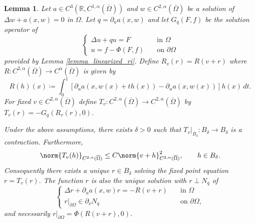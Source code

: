 \documentclass[11pt,a4paper]{amsart}
\newtheorem{Lemma}[Theorem]{Lemma}
\theoremstyle{definition}
\numberwithin{equation}{section}
\newcommand{\mR}{\mathbb{R}}                    %
\newcommand{\ol}[1]{\overline{#1}}
\newcommand{\p}{\partial}
\newcommand{\Om}{\Omega}
\begin{document}
\begin{Lemma}\label{lemma_fixed_point}
Let $a \in C^{3}(\mR, C^{1,\alpha}(\ol{\Om}))$ and $w\in C^{2,\alpha}(\ol{\Om})$ be a solution of $\Delta w + a(x,w) = 0$ in $\Om.$
Let $q = \p_ua(x,w)$ and let $G_q(F,f)$ be the solution operator of
\begin{equation*}
\begin{cases}
	\Delta u + q u = F& \quad\text{in }\Om \\
	u = f-\Phi(F,f)&\quad\text{on }\p\Om
\end{cases}
\end{equation*}
provided by Lemma \ref{lemma_linearized_ri}.
Define $R_v(r) = R(v+r)$ where $R:C^{2,\alpha}(\ol{\Om})\to C^{\alpha}(\ol{\Om})$ is given by
\begin{equation}\label{def_capital_R}
	R(h)(x) \coloneqq \int_0^1 [\p_u a(x,w(x)+th(x)) - \p_u a(x,w(x))]h(x) \,dt.
\end{equation}
For fixed $v\in C^{2,\alpha}(\ol{\Om})$ define $T_v: C^{2,\alpha}(\ol{\Om})\to C^{2,\alpha}(\ol{\Om})$ by $T_v(r) = -G_q(R_v(r), 0)$. 

Under the above assumptions, there exists $\delta>0$ such that $T_v\vert_{B_{\delta}}: B_{\delta}\to B_{\delta}$ is a contraction. Furthermore, \begin{equation}\label{eq:fixed_point_quad_estimate}
	\norm{T_v(h)}_{C^{2,\alpha}(\ol{\Om})} \leq C\norm{v+h}_{C^{2,\alpha}(\ol{\Om})}^2, \qquad h\in B_{\delta}.
\end{equation}
Consequently there exists a unique $r \in B_{\delta}$ solving the fixed point equation $r = T_v(r)$. The function $r$ is also the unique solution with $r \perp N_q$ of 
\begin{equation}\label{eq:fixed_point_equation}
\begin{cases}
	\Delta r + \p_ua(x,w)r = -R(v+r)& \quad\text{in }\Om \\
	r|_{\p \Om} \in \p_{\nu} N_q &\quad\text{on }\p\Om,
\end{cases}
\end{equation}
and necessarily $r|_{\p \Om} = \Phi(R(v+r),0)$.
\end{Lemma}
\end{document}
